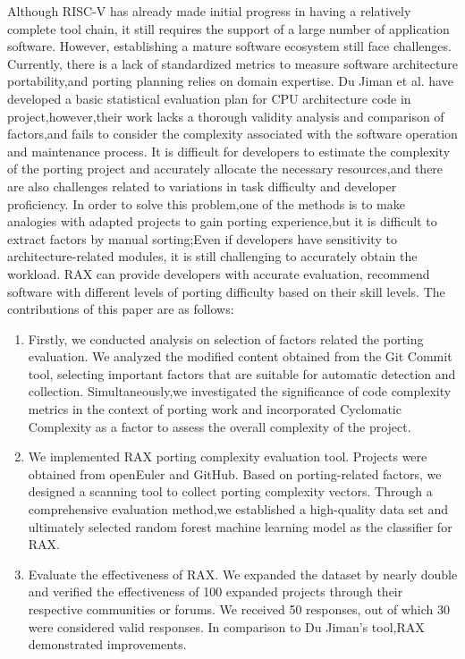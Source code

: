 \documentclass[sigconf,screen,review,anonymous]{acmart}
\begin{document}
Although RISC-V has already made initial progress in having a relatively complete tool chain, it still requires the support of a large number of application software.
However, establishing a mature software ecosystem still face challenges.
Currently, there is a lack of standardized metrics to measure software architecture portability,and porting planning relies on domain expertise.
Du Jiman et al. have developed a basic statistical evaluation plan for CPU architecture code in project,however,their work lacks a thorough validity analysis and comparison of factors,and fails to consider the complexity associated with the software operation and maintenance process.
It is difficult for developers to estimate the complexity of the porting project and accurately allocate the necessary resources,and there are also challenges related to variations in task difficulty and developer proficiency.
In order to solve this problem,one of the methods is to make analogies with adapted projects to gain porting experience,but it is difficult to extract factors by manual sorting;Even if developers have sensitivity to architecture-related modules, it is still challenging to accurately obtain the workload.
RAX can provide developers with accurate evaluation, recommend software with different levels of porting difficulty based on their skill levels.
The contributions of this paper are as follows:
\begin{enumerate}
  \item Firstly, we conducted analysis on selection of factors related the porting evaluation.
  We analyzed the modified content obtained from the Git Commit tool, selecting important factors that are suitable for automatic detection and collection.
  Simultaneously,we investigated the significance of code complexity metrics in the context of porting work and incorporated Cyclomatic Complexity as a factor to assess the overall complexity of  the project.
  \item We implemented RAX porting complexity evaluation tool.
  Projects were obtained from openEuler and GitHub.
  Based on porting-related factors, we designed a scanning tool to collect porting complexity vectors.
  Through a comprehensive evaluation method,we established a high-quality data set and ultimately selected random forest machine learning model as the classifier for RAX.
  \item Evaluate the effectiveness of RAX.
  We expanded the dataset by nearly double and verified the effectiveness of 100 expanded projects through their respective communities or forums.
  We received 50 responses, out of which 30 were considered valid responses.
  In comparison to Du Jiman's tool,RAX demonstrated  improvements.
\end{enumerate}
\end{document}
